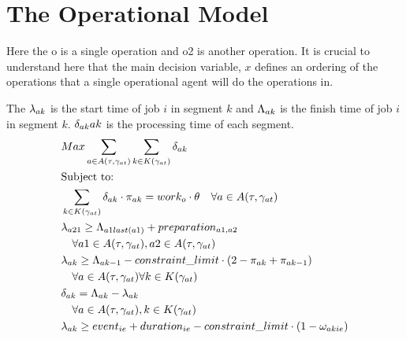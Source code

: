 \section{The Operational Model}

Here the o is a single operation and o2 is another operation. It is crucial to understand here that the main
decision variable, $x$ defines an ordering of the operations that a single operational agent will do the 
operations in. 

The $\lambda_{ak}$ is the start time of job $i$ in segment $k$ and $\Lambda_{ak}$ is the finish time of job $i$ in segment $k$.
$\delta_{ak}{a}{k}$ is the processing time of each segment. 
\begin{alignat}{2}
	& Max \sum_{a \in \SetActivity{\VarSupervisorAssignment}} \sum_{k \in \SetWorkSegment} \VarProcessingTime                                                         \\
	& \text{Subject to:} \notag                                                                                                                                       \\
    & \sum_{k \in \SetWorkSegment} \VarProcessingTime \cdot \VarActiveSegment{a}{k} = \ParOperationWork \cdot \VarIncludeActivity \quad \forall a \in \SetActivity{\VarSupervisorAssignment} \\
	& \VarStartOfSegment{a2}{1} \geq \VarFinishOfSegment{a1}{last(a1)} + \ParPreparation \notag                                                                       \\ 
	& \quad \forall a1 \in \SetActivity{\VarSupervisorAssignment}, a2 \in \SetActivity{\VarSupervisorAssignment}                                                     \\
	& \VarStartOfSegment{a}{k} \geq \VarFinishOfSegment{a}{k-1} - \ParConstraintLimit \cdot (2 - \VarActiveSegment{a}{k} + \VarActiveSegment{a}{k-1})                \notag\\
	& \quad \forall a \in \SetActivity{\VarSupervisorAssignment}\forall k \in \SetWorkSegment \\ 
	& \VarProcessingTime = \VarFinishOfSegment{a}{k} - \VarStartOfSegment{a}{k}                                                                                       \\
	& \quad \forall a \in \SetActivity{\VarSupervisorAssignment}, k \in \SetWorkSegment \notag                                                                        \\
	& \VarStartOfSegment{a}{k} \geq \ParEvent + \ParEventDuration - \ParConstraintLimit \cdot (1 - \VarSegmentInRelation)                                             \notag\\ 

\end{alignat}
